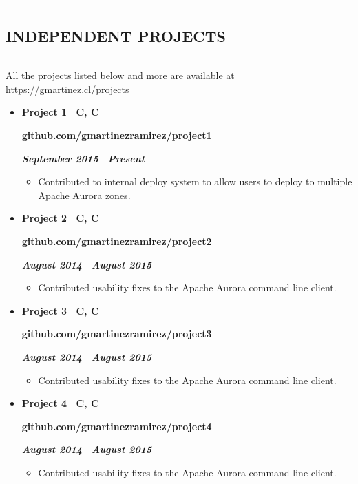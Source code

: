 \documentclass[10pt,letterpaper]{article}
\newcommand{\textbox}[1]{
  \parbox{.333\textwidth}{#1}
}
\newcommand{\CPP}
{C\nolinebreak[4]\hspace{-.05em}\raisebox{.22ex}{\footnotesize\bf ++}}
\newcommand{\sectionTitle}[1]{
  \hrule
  \vspace{-1.0em} 
  \subsection*{\uppercase{\textbf{#1}}}
  \vspace{-0.3em}
    \hrule
    \vspace{0.3em}  
}
\newcommand{\titleExperienceWithoutLocation}[4]{
  \vspace{1.0em}
  \item[]
  {
    \textbox{\textbf{#1}\hfill}\textbox{\hfil \textbf{#2}\hfil}\hfill \textbf{\emph{#3 \textendash \ #4}}
  }
}
\begin{document}
  \sectionTitle{Independent Projects}
  \noindent All the projects listed below and more are available at https://gmartinez.cl/projects
  \vspace{-0.9em}
  \begin{itemize}
    \parskip=-0.6em 
    \titleExperienceWithoutLocation{Project 1 \ C, \CPP}{github.com/gmartinezramirez/project1}{September 2015}{Present}
      \begin{itemize}[label=\textbullet]
        \itemsep0em
        \item Contributed to internal deploy system to allow users to deploy to multiple Apache Aurora zones.
      \end{itemize}
  
    \vspace{-0.5em} 
    \titleExperienceWithoutLocation{Project 2 \ C, \CPP}{github.com/gmartinezramirez/project2}{August 2014}{August 2015}
      \begin{itemize}[label=\textbullet]
        \itemsep0em
        \item Contributed usability fixes to the Apache Aurora command line client.
      \end{itemize}

    \vspace{-0.5em} 
    \titleExperienceWithoutLocation{Project 3 \ C, \CPP}{github.com/gmartinezramirez/project3}{August 2014}{August 2015}
      \begin{itemize}[label=\textbullet]
        \itemsep0em
        \item Contributed usability fixes to the Apache Aurora command line client.
      \end{itemize}
    \vspace{-0.5em} 
    \titleExperienceWithoutLocation{Project 4 \ C, \CPP}{github.com/gmartinezramirez/project4}{August 2014}{August 2015}
    \begin{itemize}[label=\textbullet]
      \itemsep0em
      \item Contributed usability fixes to the Apache Aurora command line client.
    \end{itemize}
  \end{itemize}
\end{document}
